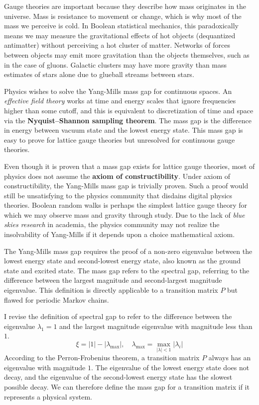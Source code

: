 \documentclass[10pt, a5paper, twoside, openright]{memoir}
\begin{document}
Gauge theories are important because they describe how mass originates in the universe. Mass is resistance to movement or change, which is why most of the mass we perceive is cold. In Boolean statistical mechanics, this paradoxically means we may measure the gravitational effects of hot objects (dequantized antimatter) without perceiving a hot cluster of matter. Networks of forces between objects may emit more gravitation than the objects themselves, such as in the case of gluons. Galactic clusters may have more gravity than mass estimates of stars alone due to glueball streams between stars.

Physics wishes to solve the Yang-Mills mass gap for continuous spaces. An \textit{effective field theory} works at time and energy scales that ignore frequencies higher than some cutoff, and this is equivalent to discretization of time and space via the \textbf{Nyquist–Shannon sampling theorem}. The mass gap is the difference in energy between vacuum state and the lowest energy state. This mass gap is easy to prove for lattice gauge theories but unresolved for continuous gauge theories.

Even though it is proven that a mass gap exists for lattice gauge theories, most of physics does not assume the \textbf{axiom of constructibility}. Under axiom of constructibility, the Yang-Mills mass gap is trivially proven. Such a proof would still be unsatisfying to the physics community that disdains digital physics theories. Boolean random walks is perhaps the simplest lattice gauge theory for which we may observe mass and gravity through study. Due to the lack of \textit{blue skies research} in academia, the physics community may not realize the insolvability of Yang-Mills if it depends upon a choice mathematical axiom.

The Yang-Mills mass gap requires the proof of a non-zero eigenvalue between the lowest energy state and second-lowest energy state, also known as the ground state and excited state. The mass gap refers to the spectral gap, referring to the difference between the largest magnitude and second-largest magnitude eigenvalue. This definition is directly applicable to a transition matrix $P$ but flawed for periodic Markov chains. 

I revise the definition of spectral gap to refer to the difference between the eigenvalue $\lambda_1 = 1$ and the largest magnitude eigenvalue with magnitude less than $1$.
$$\xi = |1| - |\lambda_{\max}|, \quad \lambda_{\max} = \underset{|\lambda|<1}{\max}|\lambda_i|$$
According to the Perron-Frobenius theorem, a transition matrix $P$ always has an eigenvalue with magnitude $1$. The eigenvalue of the lowest energy state does not decay, and the eigenvalue of the second-lowest energy state has the slowest possible decay. We can therefore define the mass gap for a transition matrix if it represents a physical system.
\end{document}

